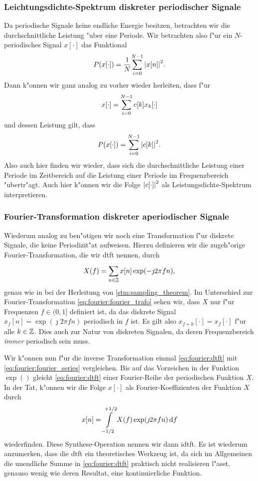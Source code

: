 \subsubsection{Leichtungsdichte-Spektrum diskreter periodischer Signale}\label{sec:fourier:disc_period_power}
%
Da periodische Signale keine endliche Energie besitzen, betrachten wir die durchschnittliche Leistung "uber eine Periode.
Wir betrachten also f"ur ein $N$-periodisches Signal $x[\cdot]$ das Funktional
\begin{equation}
    P(x[\cdot]) = \frac{1}{N}{\sum\limits_{i=0}^{N-1}{{\left| x[n] \right|}^2}}.
\end{equation}
Dann k"onnen wir ganz analog zu vorher wieder herleiten, dass f"ur
\[
x[\cdot] = {\sum\limits_{i=0}^{N-1}{c[k] x_k[\cdot]}}
\]
und dessen Leistung gilt, dass
\[
P(x[\cdot]) = {\sum\limits_{i=0}^{N-1}{{\left| c[k] \right|}^2}}.
\]
Also auch hier finden wir wieder, dass sich die durchschnittliche Leistung einer Periode im Zeitbereich auf die Leistung einer Periode im Frequenzbereich "ubertr"agt.
Auch hier k"onnen wir die Folge ${\left| c[\cdot] \right|}^2$ als Leistungsdichte-Spektrum interpretieren.
\FloatBarrier
%
\subsubsection{Fourier-Transformation diskreter aperiodischer Signale}\label{sec:fourier:disc_aperiod}
%
Wiederum analog zu  ben"otigen wir noch eine Transformation f"ur diskrete Signale, die keine Periodizit"at aufweisen.
Hierzu definieren wir die zugeh"orige Fourier-Transformation, die wir \gls{dtft} nennen, durch
\begin{equation}\label{eq:fourier:dtft}
    X(f) = {\sum\limits_{n \in \mathbb{Z}}^{}{x[n] \exp(-\jmath 2 \pi f n)}},
\end{equation}
genau wie in  bei der Herleitung von \eqref{stm:sampling_theorem}.
Im Unterschied zur  Fourier-Transformation \eqref{eq:fourier:fourier_trafo} sehen wir, dass $X$ nur f"ur Frequenzen $f \in (0,1]$ definiert ist, da das diskrete Signal $x_f[n] = \exp(\jmath 2 \pi f n)$ periodisch in $f$ ist.
Es gilt also $x_{f + k}[\cdot] = x_{f}[\cdot]$ f"ur alle $k \in \mathbb{Z}$.
Dies  auch zur Natur von diskreten Signalen, da deren Frequenzbereich \emph{immer} periodisch sein muss.

Wir k"onnen nun f"ur die inverse Transformation einmal \eqref{eq:fourier:dtft} mit \eqref{eq:fourier:fourier_series} vergleichen. 
Bis auf das Vorzeichen in der Funktion $\exp()$ gleicht \eqref{eq:fourier:dtft} einer Fourier-Reihe der periodischen Funktion $X$.
In der Tat, k"onnen wir die Folge $x[\cdot]$ als Fourier-Koeffizienten der Funktion $X$ durch
\begin{equation}\label{eq:fourier:idtft}
    x[n] = {\int\limits_{-1/2}^{+1/2}{X(f)\exp(\jmath 2 \pi f n)}\,\mathrm{d}{f}}
\end{equation}
wiederfinden.
Diese Synthese-Operation nennen wir dann \gls{idtft}.
Es ist wiederum anzumerken, dass die \gls{dtft}  ein theoretisches Werkzeug ist, da sich im Allgemeinen die unendliche Summe in \eqref{eq:fourier:dtft} praktisch nicht realisieren l"asst, genauso wenig wie deren Resultat, eine kontinuierliche Funktion.

